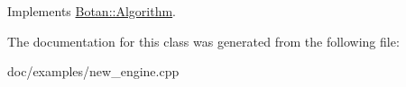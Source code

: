 Implements \hyperlink{classBotan_1_1Algorithm_a42d3ee39e051eba01ecace201fe1e6fd}{Botan\-::\-Algorithm}.



The documentation for this class was generated from the following file\-:\begin{DoxyCompactItemize}
\item 
doc/examples/new\-\_\-engine.\-cpp\end{DoxyCompactItemize}
